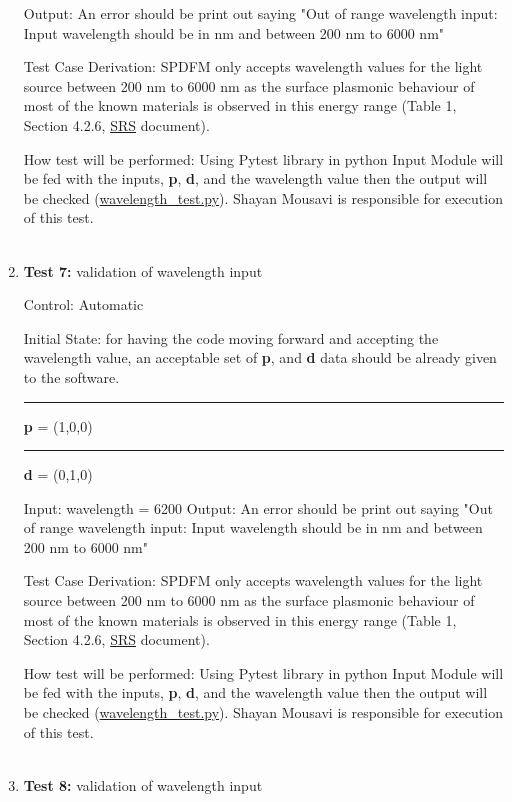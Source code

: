 \documentclass[12pt, titlepage]{article}
\begin{document}
\begin{enumerate}
Output: An error should be print out saying "Out of range wavelength input: Input wavelength should be in nm and between 200 nm to 6000 nm" 

Test Case Derivation: SPDFM only accepts wavelength values for the light source between 200 nm to 6000 nm as the surface plasmonic behaviour of most of the known materials is observed in this energy range (Table 1, Section 4.2.6, \href{https://github.com/shmouses/SPDFM/tree/master/doc/SRS}{SRS} document). 

How test will be performed: Using Pytest library in python Input Module will be fed with the inputs, \textbf{p}, \textbf{d}, and the wavelength value then the output will be checked (\href{https://github.com/shmouses/SPDFM/tree/master/src}{wavelength\_test.py}). Shayan Mousavi is responsible for execution of this test.
\\
\\
\item{\textbf{Test 7:} validation of wavelength input\\}

Control: Automatic

Initial State: for having the code moving forward and accepting the wavelength value, an acceptable set of \textbf{p}, and \textbf{d} data should be already given to the software.\\ 
\rule{2.3cm}{0pt} \textbf{p} = (1,0,0)\\
\rule{2.3cm}{0pt} \textbf{d} = (0,1,0)

Input: wavelength = 6200
Output: An error should be print out saying "Out of range wavelength input: Input wavelength should be in nm and between 200 nm to 6000 nm" 

Test Case Derivation: SPDFM only accepts wavelength values for the light source between 200 nm to 6000 nm as the surface plasmonic behaviour of most of the known materials is observed in this energy range (Table 1, Section 4.2.6, \href{https://github.com/shmouses/SPDFM/tree/master/doc/SRS}{SRS} document). 

How test will be performed: Using Pytest library in python Input Module will be fed with the inputs, \textbf{p}, \textbf{d}, and the wavelength value then the output will be checked (\href{https://github.com/shmouses/SPDFM/tree/master/src}{wavelength\_test.py}). Shayan Mousavi is responsible for execution of this test.
\\
\\
\item{\textbf{Test 8:} validation of wavelength input\\}


\end{enumerate}
\end{document}
